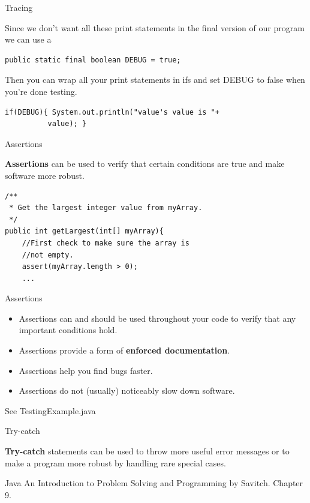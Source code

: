 \documentclass{beamer}
\begin{document}
\begin{frame}[fragile]{ Tracing}

Since we don't want all these print statements in the final version of our program we can use a 
\begin{lstlisting}
public static final boolean DEBUG = true;
\end{lstlisting}
Then you can wrap all your print statements in ifs and set DEBUG to false when you're done testing.
\begin{lstlisting}
if(DEBUG){ System.out.println("value's value is "+
          value); }
\end{lstlisting}
\end{frame}


\begin{frame}[fragile]{ Assertions}

{\bf Assertions} can be used to verify that certain conditions are true and make software more robust.

\begin{lstlisting}
/**
 * Get the largest integer value from myArray.
 */
public int getLargest(int[] myArray){
    //First check to make sure the array is 
    //not empty.
    assert(myArray.length > 0);
    ...
\end{lstlisting}
\end{frame}


\begin{frame}[fragile]{ Assertions}
\begin{itemize}
\item Assertions can and should be used throughout your code to verify that any important conditions hold.
\item Assertions provide a form of {\bf enforced documentation}.
\item Assertions help you find bugs faster.
\item Assertions do not (usually) noticeably slow down software.
\end{itemize}
\end{frame}


\begin{frame}[fragile]{ }
See TestingExample.java
\end{frame}


\begin{frame}[fragile]{ Try-catch}

{\bf Try-catch} statements can be used to throw more useful error messages or to make a program more robust by handling rare special cases.

\small
Java An Introduction to Problem Solving and Programming by Savitch. Chapter 9.
\end{frame}
\end{document}
